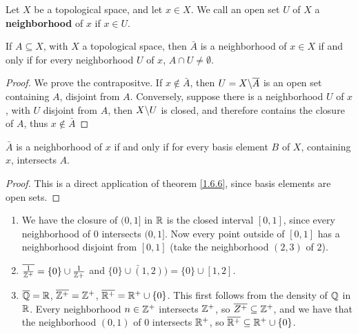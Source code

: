 \begin{definition}
    Let $X$ be a topological space, and let  $x \in X$. We call an open set  $U$
    of  $X$ a \textbf{neighborhood} of  $x$ if  $x \in U$.
\end{definition}

\begin{theorem}\label{1.6.6}
    If $A \subseteq X$, with  $X$ a topological space, then  $\bar{A}$ is a
    neighborhood of  $x \in X$ if and only if for every neighborhood  $U$ of
    $x$,  $A \cap U \neq \emptyset$.
\end{theorem}
\begin{proof}
    We prove the contrapositve. If $x \notin \bar{A}$, then
    $U=X \backslash \overline{A}$ is an open set containing  $A$, disjoint from
    $A$. Conversely, suppose there is a neighborhood $U$ of $x$, with $U$
    disjoint from  $A$, then  $X \backslash U$ is closed, and therefore contains the
    closure of  $A$, thus  $x \notin \bar{A}$
\end{proof}
\begin{corollary}
    $\bar{A}$ is a neighborhood of  $x$ if and only if for every basis element
    $B$ of  $X$, containing  $x$, intersects  $A$.
\end{corollary}
\begin{proof}
    This is a direct application of theorem \ref{1.6.6}, since basis elements
    are open sets.	
\end{proof}

\begin{example}
    \begin{enumerate}[label=(\arabic*)]
        \item We have the closure of $(0,1]$ in  $\mathbb{R}$ is the closed interval
            $[0,1]$, since every neighborhood of $0$ intersects  $(0,1]$. Now
            every point outside of  $[0,1]$ has a neighborhood disjoint from
            $[0,1]$  (take the neighborhood $(2,3)$ of  $2$).

        \item $\overline{\frac{1}{\mathbb{Z}^+}}=\{0\} \cup \frac{1}{\mathbb{Z}+}$ and $\bar{\{0\} \cup
            (1,2))}=\{0\} \cup [1,2]$.

        \item $\overline{\mathbb{Q}}=\mathbb{R}$,  $\overline{\mathbb{Z}^+}=\mathbb{Z}^+$,  $\overline{\mathbb{R}^+}=\mathbb{R}^+ \cup \{0\}$.
            This first follows from the density of $\mathbb{Q}$ in  $\mathbb{R}$. Every
            neighborhood  $n \in \mathbb{Z}^+$ intersects  $\mathbb{Z}^+$, so  $\overline{Z^+}
            \subseteq \mathbb{Z}^+$, and we have that the neighborhood  $(0,1)$ of  $0$ 
            intersects $\mathbb{R}^+$, so  $\overline{\mathbb{R}^+} \subseteq \mathbb{R}^+ \cup \{0\}$.
    \end{enumerate}		
\end{example} 

